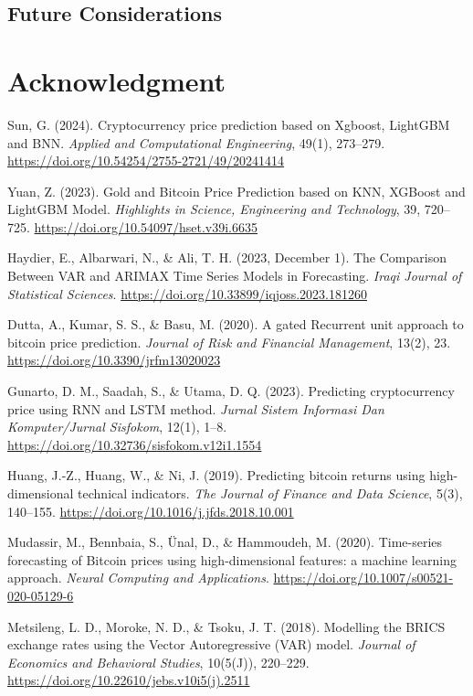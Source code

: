 \documentclass{ieeeojies}
\begin{document}
\subsection{Future Considerations}

\section*{Acknowledgment}


\begin{thebibliography}{00}
     Sun, G. (2024). Cryptocurrency price prediction based on Xgboost, LightGBM and BNN. \textit{Applied and Computational Engineering}, 49(1), 273–279. \url{https://doi.org/10.54254/2755-2721/49/20241414}

     Yuan, Z. (2023). Gold and Bitcoin Price Prediction based on KNN, XGBoost and LightGBM Model. \textit{Highlights in Science, Engineering and Technology}, 39, 720–725. \url{https://doi.org/10.54097/hset.v39i.6635}

     Haydier, E., Albarwari, N., \& Ali, T. H. (2023, December 1). The Comparison Between VAR and ARIMAX Time Series Models in Forecasting. \textit{Iraqi Journal of Statistical Sciences}. \url{https://doi.org/10.33899/iqjoss.2023.181260}

     Dutta, A., Kumar, S. S., \& Basu, M. (2020). A gated Recurrent unit approach to bitcoin price prediction. \textit{Journal of Risk and Financial Management}, 13(2), 23. \url{https://doi.org/10.3390/jrfm13020023}

     Gunarto, D. M., Saadah, S., \& Utama, D. Q. (2023). Predicting cryptocurrency price using RNN and LSTM method. \textit{Jurnal Sistem Informasi Dan Komputer/Jurnal Sisfokom}, 12(1), 1–8. \url{https://doi.org/10.32736/sisfokom.v12i1.1554}

     Huang, J.-Z., Huang, W., \& Ni, J. (2019). Predicting bitcoin returns using high-dimensional technical indicators. \textit{The Journal of Finance and Data Science}, 5(3), 140–155. \url{https://doi.org/10.1016/j.jfds.2018.10.001}

     Mudassir, M., Bennbaia, S., Ünal, D., \& Hammoudeh, M. (2020). Time-series forecasting of Bitcoin prices using high-dimensional features: a machine learning approach. \textit{Neural Computing and Applications}. \url{https://doi.org/10.1007/s00521-020-05129-6}

     Metsileng, L. D., Moroke, N. D., \& Tsoku, J. T. (2018). Modelling the BRICS exchange rates using the Vector Autoregressive (VAR) model. \textit{Journal of Economics and Behavioral Studies}, 10(5(J)), 220–229. \url{https://doi.org/10.22610/jebs.v10i5(j).2511}
\end{thebibliography}

\EOD
\end{document}
